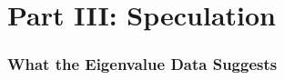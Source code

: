 \documentclass[11pt,a4paper]{article}
\theoremstyle{plain}
\theoremstyle{definition}
\begin{document}

\part*{Part III: Speculation}


\section{What the Eigenvalue Data Suggests}
\label{sec:data}
\end{document}
